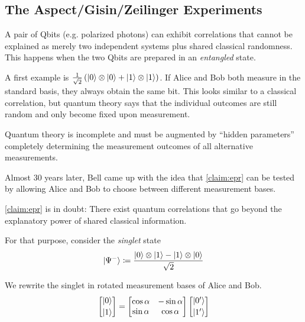 \subsection{The Aspect/Gisin/Zeilinger Experiments}\label{sec:aspect-gisin-zeilinger-experiments}

A pair of Qbits (e.g. polarized photons) can exhibit correlations that cannot be explained as merely two independent systems plus shared classical randomness.  
This happens when the two Qbits are prepared in an \emph{entangled} state.

A first example is
\(
\frac{1}{\sqrt{2}}\left(\ket{0}\otimes\ket{0}+\ket{1}\otimes\ket{1}\right)
\).
If Alice and Bob both measure in the standard basis, they always obtain the same bit.  
This looks similar to a classical correlation, but quantum theory says that the individual outcomes are still random and only become fixed upon measurement.

\begin{claim}\label{claim:epr}
Quantum theory is incomplete and must be augmented by ``hidden parameters'' completely determining the measurement outcomes of all alternative measurements.
\end{claim}

Almost 30 years later, Bell came up with the idea that \autoref{claim:epr} can be tested by allowing Alice and Bob to choose between different measurement bases.

\begin{claim}[Bell, 1964]\label{claim:bell}
\autoref{claim:epr} is in doubt:
There exist quantum correlations that go beyond the explanatory power of shared classical information.
\end{claim}

For that purpose, consider the \emph{singlet} state
\[
\ket{\Psi^{-}}
\coloneq
\frac{\ket{0}\otimes\ket{1}-\ket{1}\otimes\ket{0}}{\sqrt{2}}
\]

We rewrite the singlet in rotated measurement bases of Alice and Bob.
\[
\begin{bmatrix}
\ket{0}\\[0.2em]
\ket{1}
\end{bmatrix}
=
\begin{bmatrix}
\cos\alpha & -\sin\alpha\\
\sin\alpha & \cos\alpha
\end{bmatrix}
\begin{bmatrix}
\ket{0'}\\[0.2em]
\ket{1'}
\end{bmatrix}
\]







